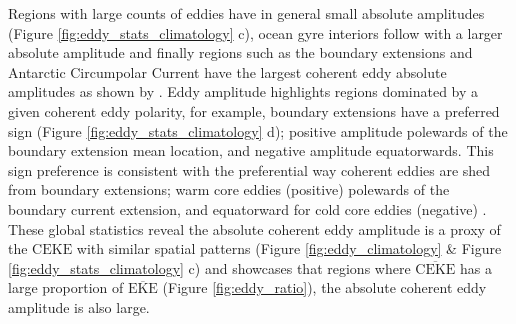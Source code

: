 \documentclass[draft,linenumbers]{agujournal2019}
\newcommand{\MEKE}{\overline{\textrm{EKE}}}
\newcommand{\MCEKE}{\overline{\textrm{CEKE}}}
\newcommand{\CEKE}{\textrm{CEKE}}
\begin{document}
	Regions with large counts of eddies have in general small absolute amplitudes (Figure \ref{fig:eddy_stats_climatology} c), ocean gyre interiors follow with a larger absolute amplitude and finally regions such as the boundary extensions and Antarctic Circumpolar Current have the largest coherent eddy absolute amplitudes as shown by \citet{Chelton_The_2011}.
	Eddy amplitude highlights regions dominated by a given coherent eddy polarity, for example, boundary extensions have a preferred sign (Figure \ref{fig:eddy_stats_climatology} d); positive amplitude polewards of the boundary extension mean location, and negative amplitude equatorwards. 
	This sign preference is consistent with the preferential way coherent eddies are shed from boundary extensions; warm core eddies (positive)  polewards of the boundary current extension, and equatorward for cold core eddies (negative) \citep{Kang_eddy_characteristics_2013,Chelton_The_2011,Chelton_Global_2007}. 
	These global statistics reveal the absolute coherent eddy amplitude is a proxy of the $\CEKE$ with similar spatial patterns (Figure \ref{fig:eddy_climatology} \& Figure \ref{fig:eddy_stats_climatology} c) and showcases that regions where $\MCEKE$ has a large proportion of $\MEKE$ (Figure \ref{fig:eddy_ratio}), the absolute coherent eddy amplitude is also large.


\end{document}
